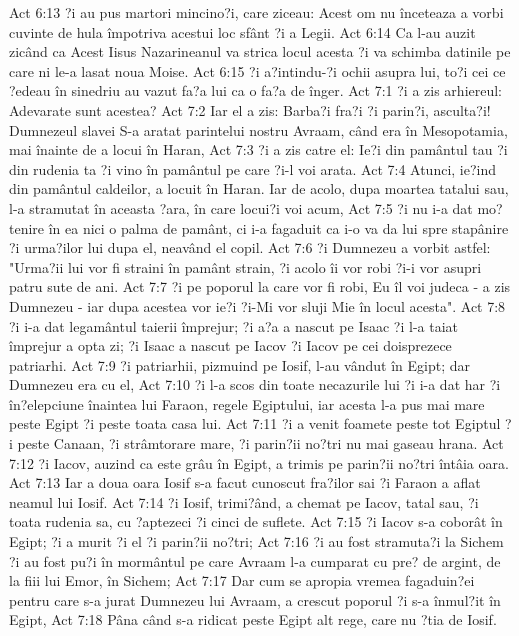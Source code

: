 Act 6:13  ?i au pus martori mincino?i, care ziceau: Acest om nu înceteaza a vorbi cuvinte de hula împotriva acestui loc sfânt ?i a Legii.
Act 6:14  Ca l-au auzit zicând ca Acest Iisus Nazarineanul va strica locul acesta ?i va schimba datinile pe care ni le-a lasat noua Moise.
Act 6:15  ?i a?intindu-?i ochii asupra lui, to?i cei ce ?edeau în sinedriu au vazut fa?a lui ca o fa?a de înger.
Act 7:1  ?i a zis arhiereul: Adevarate sunt acestea?
Act 7:2  Iar el a zis: Barba?i fra?i ?i parin?i, asculta?i! Dumnezeul slavei S-a aratat parintelui nostru Avraam, când era în Mesopotamia, mai înainte de a locui în Haran,
Act 7:3  ?i a zis catre el: Ie?i din pamântul tau ?i din rudenia ta ?i vino în pamântul pe care ?i-l voi arata.
Act 7:4  Atunci, ie?ind din pamântul caldeilor, a locuit în Haran. Iar de acolo, dupa moartea tatalui sau, l-a stramutat în aceasta ?ara, în care locui?i voi acum,
Act 7:5  ?i nu i-a dat mo?tenire în ea nici o palma de pamânt, ci i-a fagaduit ca i-o va da lui spre stapânire ?i urma?ilor lui dupa el, neavând el copil.
Act 7:6  ?i Dumnezeu a vorbit astfel: "Urma?ii lui vor fi straini în pamânt strain, ?i acolo îi vor robi ?i-i vor asupri patru sute de ani.
Act 7:7  ?i pe poporul la care vor fi robi, Eu îl voi judeca - a zis Dumnezeu - iar dupa acestea vor ie?i ?i-Mi vor sluji Mie în locul acesta".
Act 7:8  ?i i-a dat legamântul taierii împrejur; ?i a?a a nascut pe Isaac ?i l-a taiat împrejur a opta zi; ?i Isaac a nascut pe Iacov ?i Iacov pe cei doisprezece patriarhi.
Act 7:9  ?i patriarhii, pizmuind pe Iosif, l-au vândut în Egipt; dar Dumnezeu era cu el,
Act 7:10  ?i l-a scos din toate necazurile lui ?i i-a dat har ?i în?elepciune înaintea lui Faraon, regele Egiptului, iar acesta l-a pus mai mare peste Egipt ?i peste toata casa lui.
Act 7:11  ?i a venit foamete peste tot Egiptul ?i peste Canaan, ?i strâmtorare mare, ?i parin?ii no?tri nu mai gaseau hrana.
Act 7:12  ?i Iacov, auzind ca este grâu în Egipt, a trimis pe parin?ii no?tri întâia oara.
Act 7:13  Iar a doua oara Iosif s-a facut cunoscut fra?ilor sai ?i Faraon a aflat neamul lui Iosif.
Act 7:14  ?i Iosif, trimi?ând, a chemat pe Iacov, tatal sau, ?i toata rudenia sa, cu ?aptezeci ?i cinci de suflete.
Act 7:15  ?i Iacov s-a coborât în Egipt; ?i a murit ?i el ?i parin?ii no?tri;
Act 7:16  ?i au fost stramuta?i la Sichem ?i au fost pu?i în mormântul pe care Avraam l-a cumparat cu pre? de argint, de la fiii lui Emor, în Sichem;
Act 7:17  Dar cum se apropia vremea fagaduin?ei pentru care s-a jurat Dumnezeu lui Avraam, a crescut poporul ?i s-a înmul?it în Egipt,
Act 7:18  Pâna când s-a ridicat peste Egipt alt rege, care nu ?tia de Iosif.
